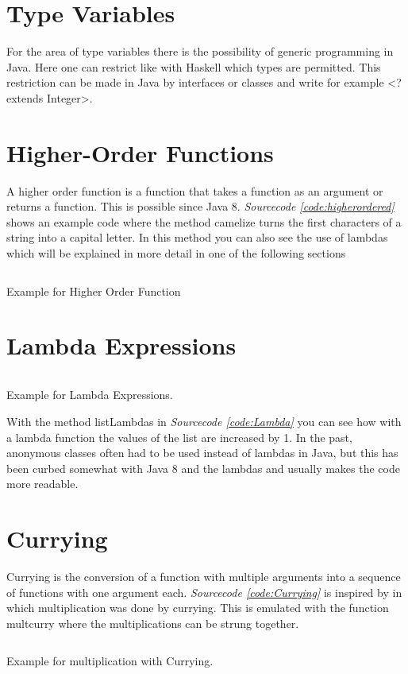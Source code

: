 \documentclass[a4paper,12pt,twoside]{scrreprt}
\begin{document}
\section{Type Variables}
For the area of type variables there is the possibility of generic programming in Java. Here one can restrict like with Haskell which types are permitted. This restriction can be made in Java by interfaces or classes and write for example <? extends Integer>.
\section{Higher-Order Functions}
A higher order function is a function that takes a function as an argument or returns a function. This is possible since Java 8. \emph{Sourcecode \ref{code:higherordered}} shows an example code where the method camelize turns the first characters of a string into a capital letter. In this method you can also see the use of lambdas which will be explained in more detail in one of the following sections
\begin{listing}[ht]
    \inputminted[fontsize=\footnotesize,linenos,breaklines]{java}{./code/HigherOrderFunctions.java}
    \caption[Example for Higher Order Function]{Example for Higher Order Function}
    \label{code:higherordered}
\end{listing}
\clearpage

\section{Lambda Expressions}
\begin{listing}[ht]
    \inputminted[fontsize=\footnotesize,linenos]{java}{./code/Lambda.java}
    \caption[Example for Lambda]{Example for Lambda Expressions.}
    \label{code:Lambda}
\end{listing}
With the method listLambdas in \emph{Sourcecode \ref{code:Lambda}} you can see how with a lambda function the values of the list are increased by 1. In the past, anonymous classes often had to be used instead of lambdas in Java, but this has been curbed somewhat with Java 8 and the lambdas and usually makes the code more readable.
\clearpage
\section{Currying}
Currying is the conversion of a function with multiple arguments into a sequence of functions with one argument each. \emph{Sourcecode \ref{code:Currying}} is inspired by \cite{Robertson_currying_2018} in which multiplication was done by currying. This is emulated with the function multcurry where the multiplications can be strung together.
\begin{listing}[ht]
    \inputminted[fontsize=\footnotesize,linenos]{java}{./code/Currying.java}
    \caption[Example for Currying]{Example for multiplication with Currying.}
    \label{code:Currying}
\end{listing}
\clearpage
\end{document}
